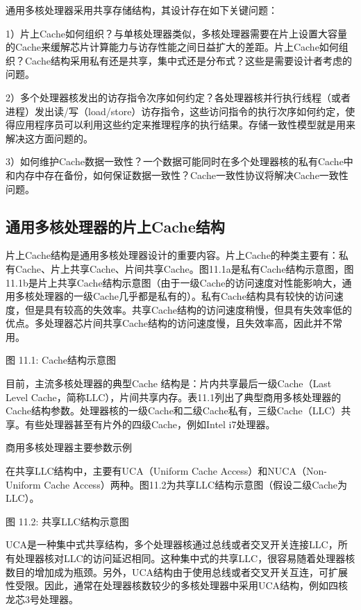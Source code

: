 \documentclass[]{ctexbook}
\begin{document}
通用多核处理器采用共享存储结构，其设计存在如下关键问题：

1）片上Cache如何组织？与单核处理器类似，多核处理器需要在片上设置大容量的Cache来缓解芯片计算能力与访存性能之间日益扩大的差距。片上Cache如何组织？Cache结构采用私有还是共享，集中式还是分布式？这些是需要设计者考虑的问题。

2）多个处理器核发出的访存指令次序如何约定？各处理器核并行执行线程（或者进程）发出读/写（load/store）访存指令，这些访问指令的执行次序如何约定，使得应用程序员可以利用这些约定来推理程序的执行结果。存储一致性模型就是用来解决这方面问题的。

3）如何维护Cache数据一致性？一个数据可能同时在多个处理器核的私有Cache中和内存中存在备份，如何保证数据一致性？Cache一致性协议将解决Cache一致性问题。

\hypertarget{ux901aux7528ux591aux6838ux5904ux7406ux5668ux7684ux7247ux4e0acacheux7ed3ux6784}{%
\subsection{通用多核处理器的片上Cache结构}\label{ux901aux7528ux591aux6838ux5904ux7406ux5668ux7684ux7247ux4e0acacheux7ed3ux6784}}

片上Cache结构是通用多核处理器设计的重要内容。片上Cache的种类主要有：私有Cache、片上共享Cache、片间共享Cache。图11.1a是私有Cache结构示意图，图11.1b是片上共享Cache结构示意图（由于一级Cache的访问速度对性能影响大，通用多核处理器的一级Cache几乎都是私有的）。私有Cache结构具有较快的访问速度，但是具有较高的失效率。共享Cache结构的访问速度稍慢，但具有失效率低的优点。多处理器芯片间共享Cache结构的访问速度慢，且失效率高，因此并不常用。

图 11.1: Cache结构示意图

目前，主流多核处理器的典型Cache 结构是：片内共享最后一级Cache（Last Level Cache，简称LLC），片间共享内存。表11.1列出了典型商用多核处理器的Cache结构参数。处理器核的一级Cache和二级Cache私有，三级Cache（LLC）共享。有些处理器甚至有片外的四级Cache，例如Intel i7处理器。

\label{tab:cache-parameter}商用多核处理器主要参数示例

在共享LLC结构中，主要有UCA（Uniform Cache Access）和NUCA（Non-Uniform Cache Access）两种。图11.2为共享LLC结构示意图（假设二级Cache为LLC）。

图 11.2: 共享LLC结构示意图

UCA是一种集中式共享结构，多个处理器核通过总线或者交叉开关连接LLC，所有处理器核对LLC的访问延迟相同。这种集中式的共享LLC，很容易随着处理器核数目的增加成为瓶颈。另外，UCA结构由于使用总线或者交叉开关互连，可扩展性受限。因此，通常在处理器核数较少的多核处理器中采用UCA结构，例如四核龙芯3号处理器。
\end{document}
